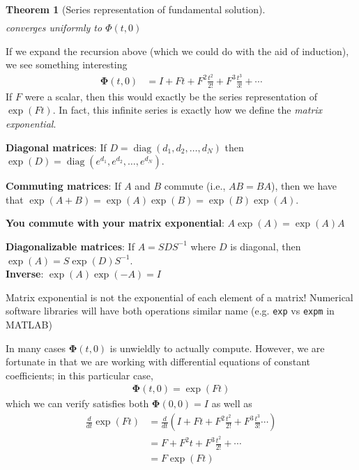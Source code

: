 \documentclass[a4paper,11pt]{exam}
\newtheorem{theorem}{Theorem}
\newcounter{ct}
\newcommand{\fundamentalSolution}{\boldsymbol{\Phi}}
\newcommand{\inv}{^{-1}}
\DeclareMathOperator*{\diag}{diag}
\begin{document}
\begin{questions}
\begin{tcolorbox}[colback=black!1!,title=Fundamental Solution]
\begin{theorem}[Series representation of fundamental solution]
\begin{align}
        \end{align}
        converges uniformly to $\Phi(t, 0)$
    \end{theorem}
    If we expand the recursion above (which we could do with the aid of induction), we see something interesting
    \begin{align}
        \fundamentalSolution(t, 0) &= I + Ft + F^2 \frac{t^2}{2!} + F^3 \frac{t^3}{3!} + \cdots
    \end{align}
    If $F$ were a scalar, then this would exactly be the series representation of $\exp(Ft)$.  In fact, this infinite series is exactly how we define the \textit{matrix exponential}.
\end{tcolorbox}

\begin{tcolorbox}[colback=black!1!,title=Properties of the matrix exponential]
    \textbf{Diagonal matrices}: If $D = \diag(d_1, d_2, \ldots, d_N)$ then $\exp(D) = \diag(e^{d_1}, e^{d_2}, \ldots, e^{d_N} )$.\newline

    \textbf{Commuting matrices}: If $A$ and $B$ commute (i.e., $AB = BA$), then we have that $\exp(A + B) = \exp(A) \exp(B) = \exp(B) \exp(A)$.\newline

    \textbf{You commute with your matrix exponential}: $A \exp(A) = \exp(A) A$
    \newline

    \textbf{Diagonalizable matrices}: If $A = SDS\inv$ where $D$ is diagonal, then
    $\exp(A) = S \exp(D) S\inv$.\\

    \textbf{Inverse}: $\exp(A) \exp(-A) = I$
\end{tcolorbox}

\begin{tcolorbox}[colback=black!1!,title=Avoid this common pitfall]
    Matrix exponential is not the exponential of each element of a matrix!
    Numerical software libraries will have both operations similar name (e.g. \verb|exp| vs \verb|expm| in MATLAB)
\end{tcolorbox}

In many cases $\fundamentalSolution(t, 0)$ is unwieldly to actually compute.  However, we are fortunate in that we are working with differential equations of constant coefficients; in this particular case, 
\begin{align}
    \fundamentalSolution(t, 0) = \exp(F t)
\end{align}
which we can verify satisfies both $\fundamentalSolution(0, 0) = I$ as well as
\begin{align}
    \frac{d}{dt} \exp(Ft) &= \frac{d}{dt} \left(I + Ft + F^2 \frac{t^2}{2!} + F^3 \frac{t^3}{3!}\cdots  \right)\\
    &= F + F^2 t + F^3 \frac{t^2}{2!} + \cdots\\
    &= F \exp(F t)
\end{align}

\end{questions}
\end{document}
